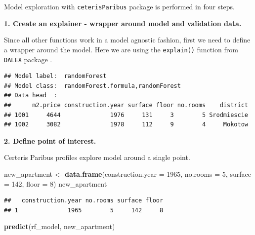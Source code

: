 \documentclass[]{krantz}
\newenvironment{Shaded}{\begin{snugshade}}{\end{snugshade}}
\newcommand{\DataTypeTok}[1]{\textcolor[rgb]{0.13,0.29,0.53}{#1}}
\newcommand{\DecValTok}[1]{\textcolor[rgb]{0.00,0.00,0.81}{#1}}
\newcommand{\KeywordTok}[1]{\textcolor[rgb]{0.13,0.29,0.53}{\textbf{#1}}}
\newcommand{\NormalTok}[1]{#1}
\newcommand{\OperatorTok}[1]{\textcolor[rgb]{0.81,0.36,0.00}{\textbf{#1}}}
\newcommand{\StringTok}[1]{\textcolor[rgb]{0.31,0.60,0.02}{#1}}
\theoremstyle{definition}
\theoremstyle{definition}
\theoremstyle{definition}
\theoremstyle{remark}
\begin{document}
Model exploration with \texttt{ceterisParibus} package is performed in
four steps.

\textbf{1. Create an explainer - wrapper around model and validation
data.}

Since all other functions work in a model agnostic fashion, first we
need to define a wrapper around the model. Here we are using the
\texttt{explain()} function from \texttt{DALEX} package \citep{R-DALEX}.

\begin{Shaded}
\end{Shaded}

\begin{verbatim}
## Model label:  randomForest 
## Model class:  randomForest.formula,randomForest 
## Data head  :
##      m2.price construction.year surface floor no.rooms    district
## 1001     4644              1976     131     3        5 Srodmiescie
## 1002     3082              1978     112     9        4     Mokotow
\end{verbatim}

\textbf{2. Define point of interest.}

Certeris Paribus profiles explore model around a single point.

\begin{Shaded}
\begin{Highlighting}[]
\NormalTok{new_apartment <-}\StringTok{ }\KeywordTok{data.frame}\NormalTok{(}\DataTypeTok{construction.year =} \DecValTok{1965}\NormalTok{, }\DataTypeTok{no.rooms =} \DecValTok{5}\NormalTok{, }\DataTypeTok{surface =} \DecValTok{142}\NormalTok{, }\DataTypeTok{floor =} \DecValTok{8}\NormalTok{)}
\NormalTok{new_apartment}
\end{Highlighting}
\end{Shaded}

\begin{verbatim}
##   construction.year no.rooms surface floor
## 1              1965        5     142     8
\end{verbatim}

\begin{Shaded}
\begin{Highlighting}[]
\KeywordTok{predict}\NormalTok{(rf_model, new_apartment)}
\end{Highlighting}
\end{Shaded}
\end{document}
